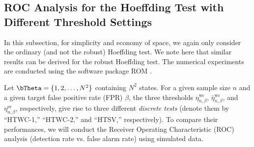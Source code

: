 \documentclass[10pt, twocolumn]{IEEEtran}
\begin{document}
\subsection{ROC Analysis for the Hoeffding Test with 
Different Threshold Settings} \label{sec:ROCHoeff}

In this subsection, for simplicity and economy of space, we again only consider the ordinary (and not the robust) Hoeffding test. We note here that similar results can be derived for the robust Hoeffding test. The numerical experiments are conducted using the software package ROM \cite{ROCHM}.

Let ${\bTheta} = \{1,2,\ldots,N^2\}$ containing $N^2$
states. For a given sample size $n$ and a given target false positive rate (FPR) $\beta$, the
three thresholds $\eta_{n,\beta}^{\text{wc}}$, $\bar \eta_{n,\beta}^{\text{wc}}$, and $\eta_{n,\beta}^{\text{sv}}$, respectively, give rise
to three different \emph{discrete tests} (denote them by ``HTWC-1,'' ``HTWC-2,'' and ``HTSV,''
respectively). To compare their performances, we will conduct the Receiver
Operating Characteristic (ROC) \cite{fawcett2006introduction} analysis (detection rate vs. false alarm
rate) using simulated data.


	
\end{document}

